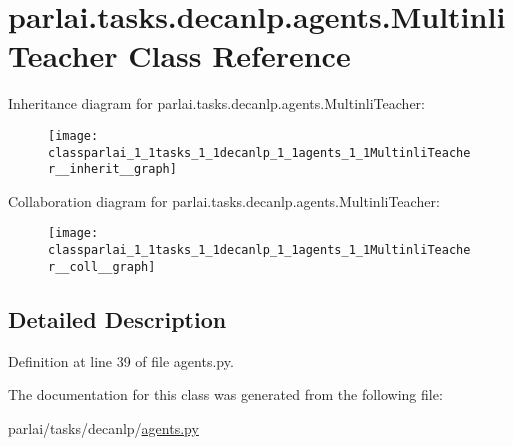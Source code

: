 \hypertarget{classparlai_1_1tasks_1_1decanlp_1_1agents_1_1MultinliTeacher}{}\section{parlai.\+tasks.\+decanlp.\+agents.\+Multinli\+Teacher Class Reference}
\label{classparlai_1_1tasks_1_1decanlp_1_1agents_1_1MultinliTeacher}


Inheritance diagram for parlai.\+tasks.\+decanlp.\+agents.\+Multinli\+Teacher\+:
\nopagebreak
\begin{figure}[H]
\begin{center}
\leavevmode
\texttt{[image: classparlai\_1\_1tasks\_1\_1decanlp\_1\_1agents\_1\_1MultinliTeacher\_\_inherit\_\_graph]}
\end{center}
\end{figure}


Collaboration diagram for parlai.\+tasks.\+decanlp.\+agents.\+Multinli\+Teacher\+:
\nopagebreak
\begin{figure}[H]
\begin{center}
\leavevmode
\texttt{[image: classparlai\_1\_1tasks\_1\_1decanlp\_1\_1agents\_1\_1MultinliTeacher\_\_coll\_\_graph]}
\end{center}
\end{figure}


\subsection{Detailed Description}


Definition at line 39 of file agents.\+py.



The documentation for this class was generated from the following file\+:\begin{DoxyCompactItemize}
\item 
parlai/tasks/decanlp/\hyperlink{parlai_2tasks_2decanlp_2agents_8py}{agents.\+py}\end{DoxyCompactItemize}
